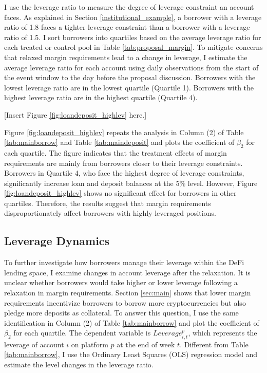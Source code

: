 \documentclass[12pt]{article}
\begin{document}
I use the leverage ratio to measure the degree of leverage constraint an account faces. As explained in Section \ref{institutional_example}, a borrower with a leverage ratio of 1.8 faces a tighter leverage constraint than a borrower with a leverage ratio of 1.5. I sort borrowers into quartiles based on the average leverage ratio for each treated or control pool in Table \ref{tab:proposal_margin}. To mitigate concerns that relaxed margin requirements lead to a change in leverage, I estimate the average leverage ratio for each account using daily observations from the start of the event window to the day before the proposal discussion. Borrowers with the lowest leverage ratio are in the lowest quartile (Quartile 1). Borrowers with the highest leverage ratio are in the highest quartile (Quartile 4).

\centerline{[Insert Figure \ref{fig:loandeposit_highlev} here.]}

Figure \ref{fig:loandeposit_highlev} repeats the analysis in Column (2) of Table \ref{tab:mainborrow} and Table \ref{tab:maindeposit} and plots the coefficient of $\beta_2$ for each quartile. The figure indicates that the treatment effects of margin requirements are mainly from borrowers closer to their leverage constraints. Borrowers in Quartile 4, who face the highest degree of leverage constraints, significantly increase loan and deposit balances at the 5\% level. However, Figure \ref{fig:loandeposit_highlev} shows no significant effect for borrowers in other quartiles. Therefore, the results suggest that margin requirements disproportionately affect borrowers with highly leveraged positions.

\subsection{Leverage Dynamics}

To further investigate how borrowers manage their leverage within the DeFi lending space, I examine changes in account leverage after the relaxation. It is unclear whether borrowers would take higher or lower leverage following a relaxation in margin requirements. Section \ref{sec:main} shows that lower margin requirements incentivize borrowers to borrow more cryptocurrencies but also pledge more deposits as collateral. To answer this question, I use the same identification in Column (2) of Table \ref{tab:mainborrow} and plot the coefficient of $\beta_2$ for each quartile. The dependent variable is $Leverage_{i,t}^p$, which represents the leverage of account $i$ on platform $p$ at the end of week $t$. Different from Table \ref{tab:mainborrow}, I use the Ordinary Least Squares (OLS) regression model and estimate the level changes in the leverage ratio. 
\end{document}
